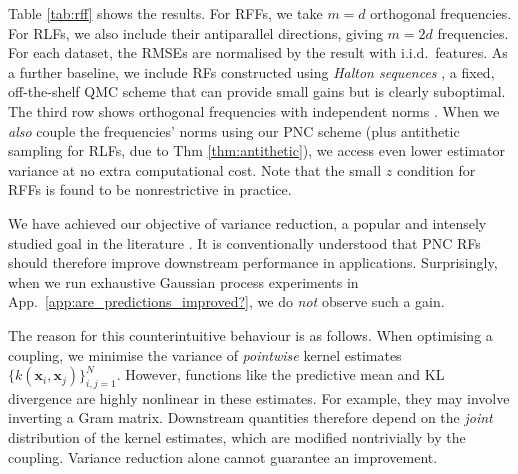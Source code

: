 Table \ref{tab:rff} shows the results. 
For RFFs, we take $m=d$ orthogonal frequencies.
For RLFs, we also include their antiparallel directions, giving $m=2d$ frequencies. 
For each dataset, the RMSEs are normalised by the result with i.i.d.~features. 
As a further baseline, we include RFs constructed using \emph{Halton sequences} \citep{dick2013high,qmc-rf}, a fixed, off-the-shelf QMC scheme that can provide small gains but is clearly suboptimal. %
The third row shows orthogonal frequencies with independent norms \citep{yu2016orthogonal}. %
When we \emph{also} couple the frequencies' norms using our PNC scheme (plus antithetic sampling for RLFs, due to Thm \ref{thm:antithetic}), we access even lower estimator variance at no extra computational cost.
Note that the small $z$ condition for RFFs is found to be nonrestrictive in practice.%

We have achieved our objective of variance reduction, a popular and intensely studied goal in the literature \citep{yu2016orthogonal, rowland2018geometrically, simrfs, likhosherstov2022chefs, qmc-rf, le2013fastfood, bojarski2017structured, choromanski2017unreasonable, lyu2017spherical, shen2017random, dao2017gaussian, munkhoeva2018quadrature}. 
It is conventionally understood that PNC RFs should therefore improve downstream performance in applications.
Surprisingly, when we run exhaustive Gaussian process experiments in App.~\ref{app:are_predictions_improved?}, we do \emph{not} observe such a gain.

The reason for this counterintuitive behaviour is as follows.
When optimising a coupling, we minimise the variance of \emph{pointwise} kernel estimates $\{k(\boldsymbol{x}_i, \boldsymbol{x}_j)\}_{i,j=1}^N$. 
However, functions like the predictive mean and KL divergence are highly nonlinear in these estimates.
For example, they may involve inverting a Gram matrix. 
Downstream quantities therefore depend on the \emph{joint} distribution of the kernel estimates, which are modified nontrivially by the coupling. 
Variance reduction alone cannot guarantee an improvement.

